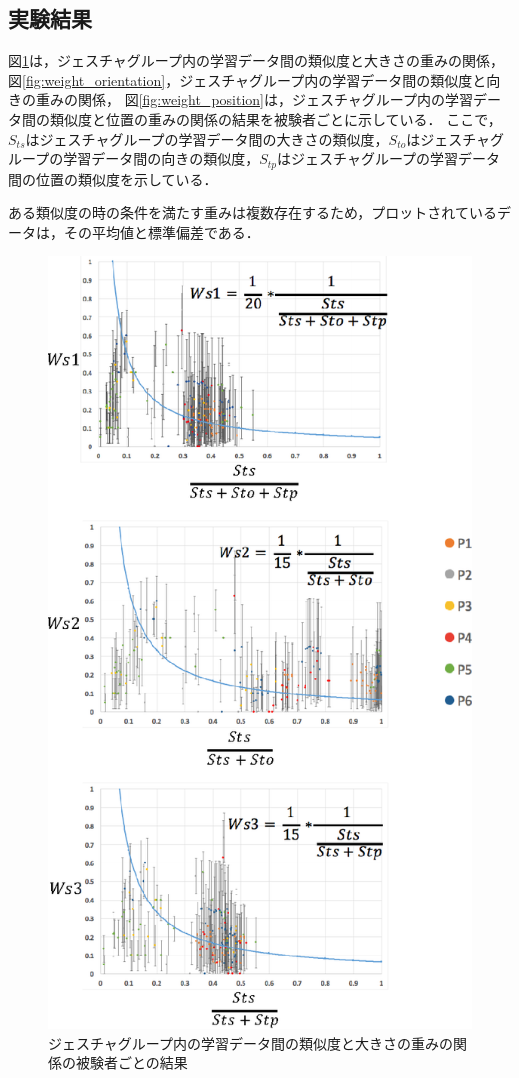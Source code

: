 \clearpage
\subsection{実験結果}

図\ref{fig:weight_size}は，ジェスチャグループ内の学習データ間の類似度と大きさの重みの関係，
図\ref{fig:weight_orientation}，ジェスチャグループ内の学習データ間の類似度と向きの重みの関係，
図\ref{fig:weight_position}は，ジェスチャグループ内の学習データ間の類似度と位置の重みの関係の結果を被験者ごとに示している．
ここで，$S_\textit{ts}$はジェスチャグループの学習データ間の大きさの類似度，$S_\textit{to}$はジェスチャグループの学習データ間の向きの類似度，$S_\textit{tp}$はジェスチャグループの学習データ間の位置の類似度を示している．

ある類似度の時の条件を満たす重みは複数存在するため，プロットされているデータは，その平均値と標準偏差である．

\begin{figure}[!h]
\centering
\includegraphics[width=0.7\columnwidth]{img/weight_size.eps}
\caption{ジェスチャグループ内の学習データ間の類似度と大きさの重みの関係の被験者ごとの結果}
\label{fig:weight_size}
\end{figure}

